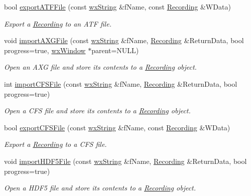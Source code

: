 \begin{DoxyCompactItemize}
bool \hyperlink{namespacestf_a062be9bdf46097610b2de4608b98180b}{exportATFFile} (const \hyperlink{classwxString}{wxString} \&fName, const \hyperlink{classRecording}{Recording} \&WData)
\begin{DoxyCompactList}\small\item\em Export a \hyperlink{classRecording}{Recording} to an ATF file. \item\end{DoxyCompactList}\item 
void \hyperlink{namespacestf_ad6a3f57c7c71b26acca0ebee596eafb3}{importAXGFile} (const \hyperlink{classwxString}{wxString} \&fName, \hyperlink{classRecording}{Recording} \&ReturnData, bool progress=true, \hyperlink{classwxWindow}{wxWindow} $\ast$parent=NULL)
\begin{DoxyCompactList}\small\item\em Open an AXG file and store its contents to a \hyperlink{classRecording}{Recording} object. \item\end{DoxyCompactList}\item 
int \hyperlink{namespacestf_ad5e49cfb0c9aae60ca3b749865ef0b6f}{importCFSFile} (const \hyperlink{classwxString}{wxString} \&fName, \hyperlink{classRecording}{Recording} \&ReturnData, bool progress=true)
\begin{DoxyCompactList}\small\item\em Open a CFS file and store its contents to a \hyperlink{classRecording}{Recording} object. \item\end{DoxyCompactList}\item 
bool \hyperlink{namespacestf_a56c281faaa3c6c52c6a409b6747ec95b}{exportCFSFile} (const \hyperlink{classwxString}{wxString} \&fName, const \hyperlink{classRecording}{Recording} \&WData)
\begin{DoxyCompactList}\small\item\em Export a \hyperlink{classRecording}{Recording} to a CFS file. \item\end{DoxyCompactList}\item 
void \hyperlink{namespacestf_a8d1d1874e112c489e02cb62458e8dc64}{importHDF5File} (const \hyperlink{classwxString}{wxString} \&fName, \hyperlink{classRecording}{Recording} \&ReturnData, bool progress=true)
\begin{DoxyCompactList}\small\item\em Open a HDF5 file and store its contents to a \hyperlink{classRecording}{Recording} object. \item\end{DoxyCompactList}\item 

\end{DoxyCompactItemize}
